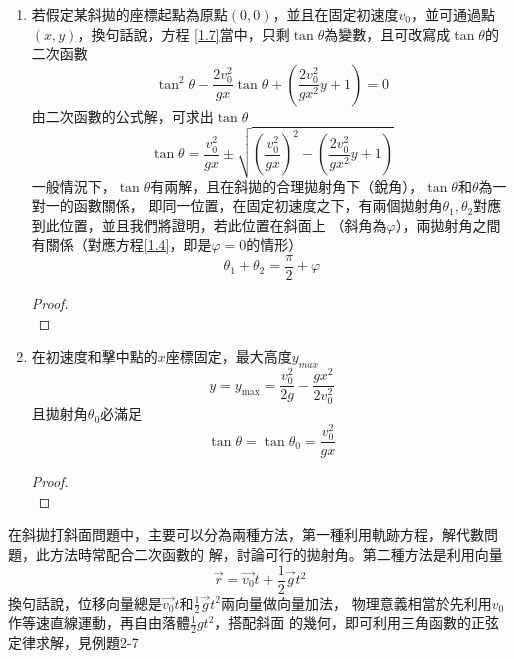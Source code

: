 \documentclass[cn,10pt,math=newtx,chinesefont=founder]{../elegantbook}
\begin{document}
\begin{enumerate}
    \item 

若假定某斜拋的座標起點為原點$(0,0)$，並且在固定初速度$v_0$，並可通過點$(x, y)$，換句話說，方程
\ref{1.7}當中，只剩$\tan \theta$為變數，且可改寫成$\tan \theta$的二次函數
\begin{equation}
    \operatorname{tan}^{2} \theta-\frac{2 v_{0}^{2}}{g x} \operatorname{tan} \theta+\left(\frac{2 v_{0}^{2}}{g x^{2}} y+1\right)=0
\end{equation}
由二次函數的公式解，可求出$\tan \theta$
\begin{equation}
    \operatorname{tan} \theta=\frac{v_{0}^{2}}{g x} \pm \sqrt{\left(\frac{v_{0}^{2}}{g x}\right)^{2}-\left(\frac{2 v_{0}^{2}}{g x^{2}} y+1\right)}
\end{equation}
一般情況下，$\tan \theta$有兩解，且在斜拋的合理拋射角下（銳角），$\tan \theta$和$\theta$為一對一的函數關係，
即同一位置，在固定初速度之下，有兩個拋射角$\theta_1, \theta_2$對應到此位置，並且我們將證明，若此位置在斜面上
（斜角為$\varphi$），兩拋射角之間有關係（對應方程\ref{1.4}，即是$\varphi = 0$的情形）
\begin{equation}
    \theta_1+\theta_2 = \frac{\pi}{2}+\varphi
\end{equation}
\begin{proof}
    \\[20em]
\end{proof}
    \item 在初速度和擊中點的$x$座標固定，最大高度$y_{max}$
    \begin{equation}
        y=y_{\max }=\frac{v_{0}^{2}}{2 g}-\frac{g x^{2}}{2 v_{0}^{2}}
    \end{equation}
    且拋射角$\theta_0$必滿足
    \begin{equation}
        \operatorname{tan} \theta=\operatorname{tan} \theta_{0}=\frac{v_{0}^{2}}{g x}
    \end{equation}
    \begin{proof}
        \\[20em]
    \end{proof}

\end{enumerate}
在斜拋打斜面問題中，主要可以分為兩種方法，第一種利用軌跡方程，解代數問題，此方法時常配合二次函數的
解，討論可行的拋射角。第二種方法是利用向量
\begin{equation}
    \vec{r} = \vec{v_0}t+\frac{1}{2}\vec{g}t^2 
\end{equation}
換句話說，位移向量總是$\vec{v_0}t$和$\frac{1}{2}\vec{g}t^2$兩向量做向量加法，
物理意義相當於先利用$v_0$作等速直線運動，再自由落體$\frac{1}{2}gt^2$，搭配斜面
的幾何，即可利用三角函數的正弦定律求解，見例題2-7
\end{document}
